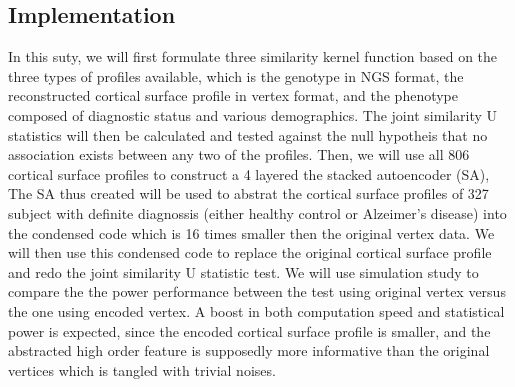 \subsection{Implementation}
In this suty, we will first formulate three similarity kernel function based on the three types of profiles available, which is the genotype in NGS format, the reconstructed cortical surface profile in vertex format, and the phenotype composed of diagnostic status and various demographics. The joint similarity U statistics will then be calculated and tested against the null hypotheis that no association exists between any two of the profiles.
Then, we will use all 806 cortical surface profiles to construct a 4 layered the stacked autoencoder (SA), The SA thus created will be used to abstrat the cortical surface profiles of 327 subject with definite diagnossis (either healthy control or Alzeimer's disease) into the condensed code which is 16 times smaller then the original vertex data. We will then use this condensed code to replace the original cortical surface profile and redo the joint similarity U statistic test.
We will use simulation study to compare the the power performance between the test using original vertex versus the one using encoded vertex. A boost in both computation speed and statistical power is expected, since the encoded cortical surface profile is smaller, and the abstracted high order feature is supposedly more informative than the original vertices which is tangled with trivial noises.
